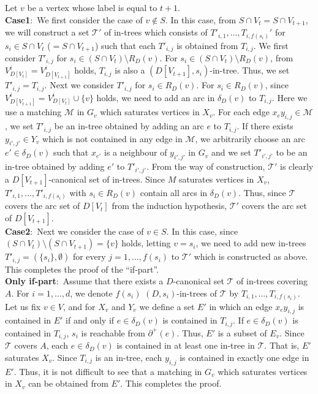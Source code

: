 \documentclass[11pt]{article}
\newcounter{ni}
\theoremstyle{plain}
\newcommand{\eop}{\hfill \usebox{\ProofSym}}
\newenvironment{proof}{\noindent {\it Proof.}}{\eop\par\vspace{0.3cm}}
\begin{document}
\begin{proof}
Let $v$ be a vertex whose label is equal to $t+1$.\\ 
{\bf Case1$\colon$}
We first consider the case of $v \notin S$. 
In this case, from $S\cap V_t=S\cap V_{t+1}$, 
we will construct a set $\mathcal{T}'$ of in-trees which consists of $T'_{i,1},\ldots,T_{i,f(s_i)}'$ 
for $s_i \in S\cap V_{t}$ ($=S\cap V_{t+1}$) such that each $T'_{i,j}$ 
is obtained from $T_{i,j}$. We first consider $T'_{i,j}$ for $s_i \in (S\cap V_{t})\setminus R_D(v)$. 
For $s_i \in (S\cap V_t)\setminus R_D(v)$, 
from $V^i_{D[V_t]}=V^i_{D[V_{t+1}]}$ holds, 
$T_{i,j}$ is also a $(D[V_{t+1}],s_i)$-in-tree. Thus, we set $T'_{i,j}=T_{i,j}$. 
Next we consider $T'_{i,j}$ for $s_i \in R_D(v)$. 
For $s_i \in R_D(v)$, since $V^i_{D[V_{t+1}]}=V^i_{D[V_{t}]}\cup \{v\}$ holds,
we need to add an arc in $\delta_{D}(v)$ to $T_{i,j}$. 
Here we use a matching $\mathcal{M}$ in $G_v$ which saturates vertices in $X_v$. 
For each edge $x_ey_{i,j} \in \mathcal{M}$, we set $T'_{i,j}$ be an in-tree obtained by adding 
an arc $e$ to $T_{i,j}$. If there exists $y_{i',j'} \in Y_v$  
which is not contained in any edge in $\mathcal{M}$, 
we arbitrarily choose an arc $e'\in \delta_D(v)$ such that $x_{e'}$ is a neighbour of $y_{i',j'}$ in $G_v$
and we set $T'_{i',j'}$ to be 
an in-tree obtained by adding $e'$ to $T'_{i',j'}$. 
From the way of construction, $\mathcal{T}'$ is clearly a $D[V_{t+1}]$-canonical set of in-trees.
Since $M$ saturates vertices in $X_v$, $T'_{i,1},\ldots,T'_{i,f(s_i)}$ with $s_i \in R_D(v)$ contain all arcs in 
$\delta_D(v)$. Thus, since $\mathcal{T}$ covers the arc set of $D[V_t]$ from the induction hypothesis, 
$\mathcal{T}'$ covers the arc set of $D[V_{t+1}]$. \\
{\bf Case2$\colon$}
Next we consider the case of $v \in S$. In this case, since $(S\cap V_{t})\setminus (S\cap V_{t+1})=\{v\}$ holds, 
letting $v =s_i$, 
we need to add new in-trees $T'_{i,j}=(\{s_i\}, \emptyset)$ for every $j=1,\ldots,f(s_i)$ 
to $\mathcal{T}'$ which is constructed as above. 
This completes the proof of the ``if-part''.\\
{\bf Only if-part$\colon$}
Assume that there exists a $D$-canonical set $\mathcal{T}$ of in-trees covering
$A$. For $i=1,\ldots,d$, we denote $f(s_i)$ $(D,s_i)$-in-trees
of $\mathcal{T}$ by $T_{i,1},\ldots,T_{i,f(s_i)}$.
Let us fix $v \in V$, and for $X_v$ and $Y_v$ we define a set $E'$ in which
an edge $x_e y_{i,j}$ is contained in $E'$ if and only if $e \in
\delta_D(v)$ is contained in $T_{i,j}$. If $e\in
\delta_D(v)$ is contained in $T_{i,j}$, $s_i$
is reachable from $\partial^+(e)$. Thus, 
$E'$ is a subset of $E_v$. 
Since $\mathcal{T}$ covers $A$,
each $e \in \delta_D(v)$ is contained in at least one in-tree in
$\mathcal{T}$. That is, $E'$ saturates $X_v$. 
Since $T_{i,j}$ is an in-tree, 
each $y_{i,j}$ is contained in exactly one edge in $E'$. 
Thus, it is not difficult to see
that a matching in $G_v$ which saturates vertices in $X_v$ can be
obtained from $E'$. This completes the proof.  
\end{proof}
\end{document}

